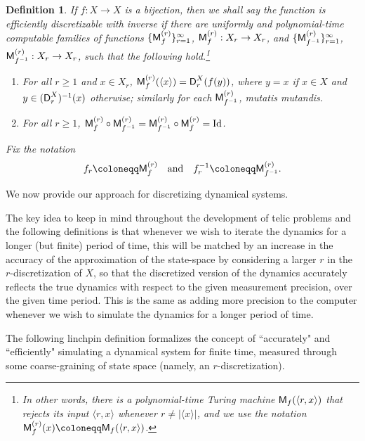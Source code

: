 \documentclass{amsart}
\theoremstyle{theorem}
\newtheorem{definition}[theorem]{Definition}
\theoremstyle{remark}
\numberwithin{equation}{section}
\DeclareMathOperator{\Id}{Id}
\newcommand{\ccD}{\textsf{\upshape D}}
\newcommand{\ccM}{\textsf{\upshape M}}
\begin{document}
\begin{definition}\label{defFuncDisc2}
If $f:X\rightarrow X$ is a bijection, then we shall say the function is \emph{efficiently discretizable with inverse} if there are uniformly and polynomial-time computable families of functions $\{\ccM_f^{(r)}\}_{r=1}^\infty$, $\ccM_f^{(r)}:X_r\rightarrow X_r$, and $\{\ccM_{f^{-1}}^{(r)}\}_{r=1}^\infty$, $\ccM_{f^{-1}}^{(r)}:X_r\rightarrow X_r$, such that the following hold.\footnote{In other words, there is a polynomial-time Turing machine $\ccM_f(\langle r, x\rangle)$ that rejects its input $\langle r,x\rangle$ whenever $r \neq |\langle x\rangle|$, and we use the notation $\ccM_f^{(r)}(x)\coloneqq\ccM_f(\langle r, x\rangle)$.}
\begin{enumerate}
\item For all $r \geq 1$ and $x \in X_r$, $\ccM_f^{(r)}(\langle x \rangle) = \ccD^X_r(f(y))$, where $y=x$ if $x \in X$ and $y \in (\ccD_r^X)^{-1}(x)$ otherwise; similarly for each $\ccM_{f^{-1}}^{(r)}$, mutatis mutandis.
\item For all $r \geq 1$, $\ccM^{(r)}_f \circ \ccM^{(r)}_{f^{-1}} = \ccM^{(r)}_{f^{-1}} \circ \ccM^{(r)}_{f} = \Id$.
\end{enumerate}
Fix the notation
\[
f_r \coloneqq \ccM^{(r)}_f \quad \text{and}\quad  f_r^{-1} \coloneqq \ccM^{(r)}_{f^{-1}}.
\]
\end{definition}

We now provide our approach for discretizing dynamical systems.

The key idea to keep in mind throughout the development of telic problems and the following definitions is that whenever we wish to iterate the dynamics for a longer (but finite) period of time, this will be matched by an increase in the accuracy of the approximation of the state-space by considering a larger $r$ in the $r$-discretization of $X$, so that the discretized version of the dynamics accurately reflects the true dynamics with respect to the given measurement precision, over the given time period. This is the same as adding more precision to the computer whenever we wish to simulate the dynamics for a longer period of time.

The following linchpin definition formalizes the concept of ``accurately" and ``efficiently" simulating a dynamical system for finite time, measured through some coarse-graining of state space (namely, an $r$-discretization).
\end{document}
